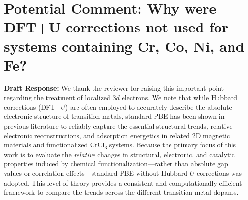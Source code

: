 \section*{Potential Comment: Why were DFT+U corrections not used for systems containing Cr, Co, Ni, and Fe?}

\textbf{Draft Response:}
We thank the reviewer for raising this important point regarding the treatment of localized $3d$ electrons. We note that while Hubbard corrections (DFT+$U$) are often employed to accurately describe the absolute electronic structure of transition metals, standard PBE has been shown in previous literature to reliably capture the essential structural trends, relative electronic reconstructions, and adsorption energetics in related 2D magnetic materials and functionalized CrCl$_3$ systems. Because the primary focus of this work is to evaluate the \textit{relative} changes in structural, electronic, and catalytic properties induced by chemical functionalization—rather than absolute gap values or correlation effects—standard PBE without Hubbard $U$ corrections was adopted. This level of theory provides a consistent and computationally efficient framework to compare the trends across the different transition-metal dopants.
